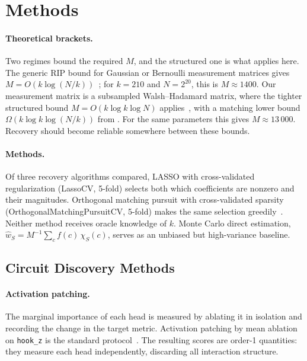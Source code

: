 \documentclass{article}
\begin{document}



\appendix

\section{Methods}

\paragraph{Theoretical brackets.}

Two regimes bound the required $M$, and the structured one is what applies here. The generic RIP bound for Gaussian or Bernoulli measurement matrices gives
$M = O(k \log(N/k))$~\citep{candes2005decoding}; for $k=210$ and
$N = 2^{20}$, this is $M \approx 1400$. Our measurement matrix is a
subsampled Walsh--Hadamard matrix, where the tighter structured bound
$M = O(k \log k \log N)$ applies~\citep{bourgain2014,rudelson2008sparse},
with a matching lower bound $\Omega(k \log k \log(N/k))$ from
\citet{blasiok2019sparse}. For the same parameters this gives $M \approx 13\,000$.
Recovery should become reliable somewhere between these bounds.

\paragraph{Methods.}

Of three recovery algorithms compared, LASSO with cross-validated regularization (LassoCV, 5-fold) selects both which coefficients are nonzero
and their magnitudes. Orthogonal matching pursuit with cross-validated
sparsity (OrthogonalMatchingPursuitCV, 5-fold) makes the same selection
greedily~\citep{tropp2007signal}. Neither method receives oracle
knowledge of $k$. Monte Carlo
direct estimation, $\hat{w}_S = M^{-1} \sum_c f(c)\, \chi_S(c)$, serves as
an unbiased but high-variance baseline.


\subsection{Circuit Discovery Methods}
\label{sec:discovery-methods}

\paragraph{Activation patching.}

The marginal importance of each head is measured by ablating it in
isolation and recording the change in the target metric. Activation
patching by mean ablation on \texttt{hook\_z} is the standard
protocol~\citep{wang2022ioi}. The resulting scores are order-1
quantities: they measure each head independently, discarding all
interaction structure.
\end{document}
